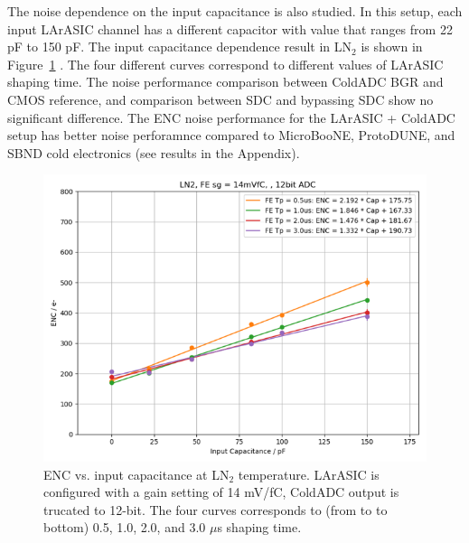 The noise dependence on the input capacitance is also studied. In this setup, each input LArASIC channel has
a different capacitor with value that ranges from 22 pF to 150 pF. The input capacitance dependence result in 
LN$_2$ is shown in Figure~\ref{fig:noise_capacitance} . The four different curves correspond 
to different values of LArASIC shaping time. 
The noise performance comparison between ColdADC BGR and CMOS reference, and comparison between 
SDC and bypassing SDC show no significant difference.
The ENC noise performance for the LArASIC + ColdADC setup has better noise perforamnce compared to 
MicroBooNE, ProtoDUNE, and SBND cold electronics (see results in the Appendix).
\begin{figure}[h!]
\centering
  \includegraphics[width=0.8\linewidth]{figures/noise_capacitance.png}
  \caption{ENC vs. input capacitance at LN$_2$ temperature. LArASIC is configured with a gain setting of
14 mV/fC, ColdADC output is trucated to 12-bit. The four curves corresponds to (from to to bottom) 0.5, 
1.0, 2.0, and 3.0 $\mu$s shaping time.} 
  \label{fig:noise_capacitance}
\end{figure}

